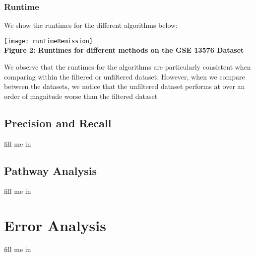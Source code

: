\documentclass[12pt]{scrartcl}
\begin{document}
    \subsubsection{Runtime}
	We show the runtimes for the different algorithms below:
    
    \begin{center}
   	\texttt{[image: runTimeRemission]}\\
    \textbf{Figure 2: Runtimes for different methods on the GSE 13576 Dataset}
    \end{center}
    
    We observe that the runtimes for the algorithms are particularly consistent when comparing within the filtered or unfiltered dataset. However, when we compare between the datasets, we notice that the unfiltered dataset performs at over an order of magnitude worse than the filtered dataset
    
    \subsection{Precision and Recall}
    fill me in
    \subsection{Pathway Analysis}
    fill me in

	
    
    \section{Error Analysis}
    fill me in
    
    
    
\end{document}
